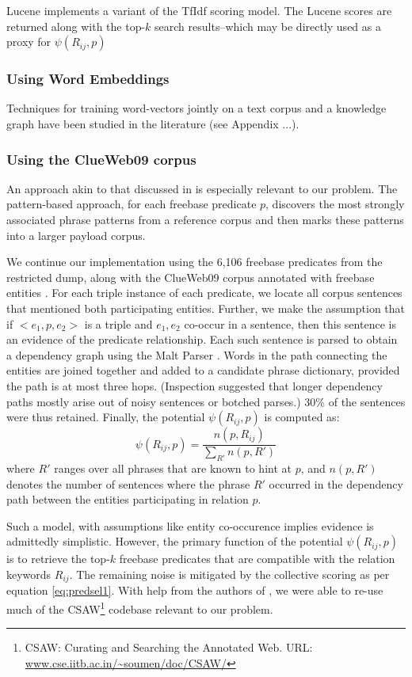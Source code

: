 \documentclass[a4paper, twoside, 12pt]{report}
\begin{document}
Lucene implements a variant of the TfIdf scoring model. The Lucene scores are returned along with the top-$k$ search results--which may be directly used as a proxy for $\psi(R_{ij}, p)$ 

\subsubsection{Using Word Embeddings}
Techniques for training word-vectors jointly on a text corpus and a knowledge graph have been studied in the literature (see Appendix ...). 

\subsubsection{Using the ClueWeb09 corpus}
An approach akin to that discussed in \cite{joshiknowledge} is especially relevant to our problem. The pattern-based approach, for each freebase predicate $p$, discovers the most strongly associated phrase patterns from a reference corpus and then marks these patterns into a larger payload corpus. 

We continue our implementation using the 6,106 freebase predicates from the restricted dump, along with the ClueWeb09 corpus annotated with freebase entities \cite{gabrilovich2013facc1}. For each triple instance of each predicate, we locate all corpus sentences that mentioned both participating entities. Further, we make the assumption that if $<e_1, p, e_2>$ is a triple and $e_1, e_2$ co-occur in a sentence, then this sentence is an evidence of the predicate relationship. Each such sentence is parsed to obtain a dependency graph using the Malt Parser \cite{nivre2007maltparser}. Words in the path connecting the entities are joined together and added to a candidate phrase dictionary, provided the path is at most three hops. (Inspection suggested that longer dependency paths mostly arise out of noisy sentences or botched parses.) 30\% of the sentences were
thus retained. Finally, the potential $\psi(R_{ij}, p)$ is computed as:
$$\psi(R_{ij},p) = \frac{n(p, R_{ij})}{\sum_{R'}{n(p, R')}}$$
where $R'$ ranges over all phrases that are known to
hint at $p$, and $n(p, R')$ denotes the number of sentences
where the phrase $R'$ occurred in the dependency
path between the entities participating in relation
$p$. 

Such a model, with assumptions like entity co-occurence implies evidence is admittedly simplistic. However, the primary function of the potential $\psi(R_{ij}, p)$ is to retrieve the top-$k$ freebase predicates that are compatible with the relation keywords $R_{ij}$. The remaining noise is mitigated by the collective scoring as per equation \ref{eq:predsel1}. With help from the authors of \cite{joshiknowledge}, we were able to re-use much of the CSAW\footnote{CSAW: Curating and Searching the Annotated Web. URL: \url{www.cse.iitb.ac.in/~soumen/doc/CSAW/}} codebase relevant to our problem.
\end{document}
